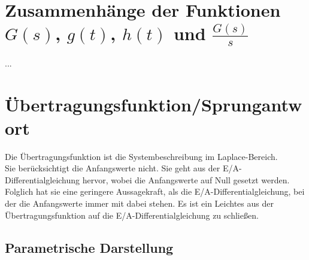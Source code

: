 \documentclass[
  ngerman
  ,12pt
  ,pdftex
]{article}
\begin{document}
\section{Zusammenhänge der Funktionen $G(s)$, $g(t)$, $h(t)$ und $\frac{G(s)}{s}$}
...

\section{Übertragungsfunktion/Sprungantwort}
Die Übertragungsfunktion ist die Systembeschreibung im Laplace-Bereich.\\
Sie berücksichtigt die Anfangswerte nicht. Sie geht aus der E/A-Differential\-gleichung hervor, wobei die Anfangswerte auf Null gesetzt werden. Folglich hat sie eine geringere Aussagekraft, als die E/A-Differentialgleichung, bei der die Anfangswerte immer mit dabei stehen. Es ist ein Leichtes aus der Übertragungsfunktion auf die E/A-Differentialgleichung zu schließen.
\subsection{Parametrische Darstellung} %


\end{document}
